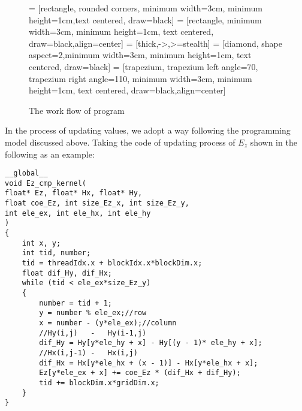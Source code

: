 \begin{figure}[hp]
	\centering
	 = [rectangle, rounded corners, minimum width=3cm, minimum height=1cm,text centered, draw=black]
	 = [rectangle, minimum width=3cm, minimum height=1cm, text centered, draw=black,align=center]
	 = [thick,->,>=stealth]
	 = [diamond, shape aspect=2,minimum width=3cm, minimum height=1cm, text centered, draw=black]
	 = [trapezium, trapezium left angle=70, trapezium right angle=110, minimum width=3cm, minimum height=1cm, text centered, draw=black,align=center]
	\caption{The work flow of program}
	\label{ch4: workflow}
\end{figure}

In the process of updating values, we adopt a way following the programming model discussed above. Taking the code of updating process of $E_z$ shown in the following as an example:

\begin{lstlisting}
__global__
void Ez_cmp_kernel(
float* Ez, float* Hx, float* Hy,
float coe_Ez, int size_Ez_x, int size_Ez_y,
int ele_ex, int ele_hx, int ele_hy
)
{
	int x, y;
	int tid, number;
	tid = threadIdx.x + blockIdx.x*blockDim.x;
	float dif_Hy, dif_Hx;
	while (tid < ele_ex*size_Ez_y)
	{
		number = tid + 1;
		y = number % ele_ex;//row
		x = number - (y*ele_ex);//column
		//Hy(i,j)	-	Hy(i-1,j)
		dif_Hy = Hy[y*ele_hy + x] - Hy[(y - 1)* ele_hy + x];
		//Hx(i,j-1)	-	Hx(i,j)
		dif_Hx = Hx[y*ele_hx + (x - 1)] - Hx[y*ele_hx + x];
		Ez[y*ele_ex + x] += coe_Ez * (dif_Hx + dif_Hy);
		tid += blockDim.x*gridDim.x;
	}
}
\end{lstlisting}


